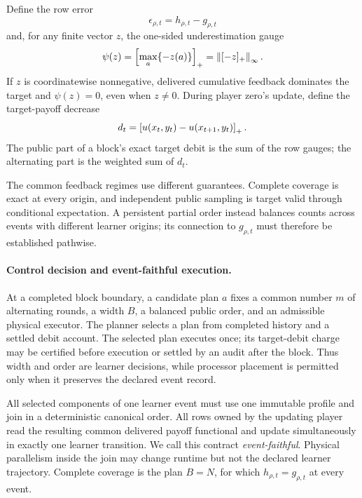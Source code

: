Define the row error
\begin{equation}
\epsilon_{\rho,t}=h_{\rho,t}-g_{\rho,t}
\label{eq:row-error}
\end{equation}
and, for any finite vector $z$, the one-sided underestimation gauge
\begin{equation}
\psi(z)=\left[\max_a\{-z(a)\}\right]_+=\left\lVert [-z]_+ \right\rVert_\infty.
\label{eq:psi}
\end{equation}
If $z$ is coordinatewise nonnegative, delivered cumulative feedback dominates
the target and $\psi(z)=0$, even when $z\ne0$.  During player zero's update,
define the target-payoff decrease
\begin{equation}
d_t=\left[u(x_t,y_t)-u(x_{t+1},y_t)\right]_+.
\label{eq:target-decrease}
\end{equation}
The public part of a block's exact target debit is the sum of the row gauges;
the alternating part is the weighted sum of $d_t$.

The common feedback regimes use different guarantees.  Complete coverage is
exact at every origin, and independent public sampling is target valid through
conditional expectation.  A persistent partial order instead balances counts
across events with different learner origins; its connection to
$g_{\rho,t}$ must therefore be established pathwise.

\paragraph{Control decision and event-faithful execution.}
At a completed block boundary, a candidate plan $a$ fixes a common number $m$
of alternating rounds, a width $B$, a balanced public order, and an admissible
physical executor.  The planner selects a plan from completed history and a
settled debit account.  The selected plan executes once; its target-debit
charge may be certified before execution or settled by an audit after the
block.  Thus width and order are learner decisions, while processor placement
is permitted only when it preserves the declared event record.

All selected components of one learner event must use one immutable profile
and join in a deterministic canonical order.  All rows owned by the updating
player read the resulting common delivered payoff functional and update
simultaneously in exactly one learner transition.  We call this contract
\emph{event-faithful}.  Physical
parallelism inside the join may change runtime but not the declared learner
trajectory.  Complete coverage is the plan $B=N$, for which
$h_{\rho,t}=g_{\rho,t}$ at every event.
